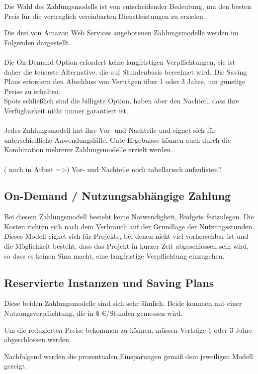Die Wahl des Zahlungsmodells ist von entscheidender Bedeutung, um den besten Preis für die vertraglich vereinbarten Dienstleistungen zu erzielen.

Die drei von Amazon Web Services angebotenen Zahlungsmodelle werden im Folgenden dargestellt.
\\\\
Die On-Demand-Option erfordert keine langfristigen Verpflichtungen, sie ist daher die teuerste Alternative, die auf Stundenbasis berechnet wird. Die Saving Plans erfordern den Abschluss von Verträgen über 1 oder 3 Jahre, um günstige Preise zu erhalten.
\\Spots schließlich sind die billigste Option, haben aber den Nachteil, dass ihre Verfügbarkeit nicht immer garantiert ist.
\\\\
Jedes Zahlungsmodell hat ihre Vor- und Nachteile und eignet sich für unterschiedliche Anwendungsfälle. Gute Ergebnisse können auch durch die Kombination mehrerer Zahlungsmodelle erzielt werden.
\\\\
( noch in Arbeit =>)
Vor- und Nachteile noch tabellarisch aufzulisten!!


\subsection{On-Demand / Nutzungsabhängige Zahlung}
Bei diesem Zahlungsmodell besteht keine Notwendigkeit, Budgets festzulegen. Die Kosten richten sich nach dem Verbrauch auf der Grundlage der Nutzungsstunden.
\\
Dieses Modell eignet sich für Projekte, bei denen nicht viel vorhersehbar ist und die Möglichkeit besteht, dass das Projekt in kurzer Zeit abgeschlossen sein wird, so dass es keinen Sinn macht, eine langfristige Verpflichtung einzugehen.
\\
\subsection{Reservierte Instanzen und Saving Plans}
\begin{flushleft}
Diese beiden Zahlungsmodelle sind sich sehr ähnlich. Beide kommen mit einer Nutzungsverpflichtung, die in \$-€/Stunden gemessen wird.

Um die reduzierten Preise bekommen zu können, müssen Verträge 1 oder 3 Jahre abgeschlossen werden.

Nachfolgend werden die prozentualen Einsparungen gemäß dem jeweiligen Modell gezeigt.
\end{flushleft}

